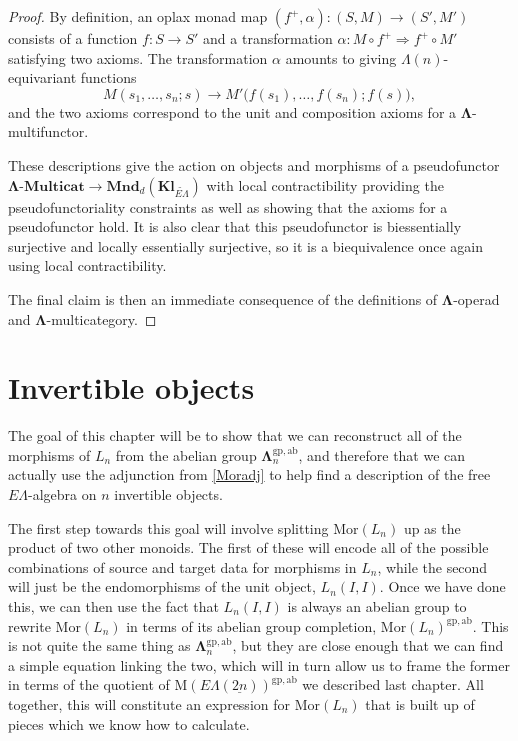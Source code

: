 \documentclass{amsbook} %
\newcommand{\mb}{\mathbf}
\newcommand{\MLn}{\mathbf{\Lambda}_n}
\newcommand{\MorLn}{\mathrm{Mor}(L_n)}
\newcommand{\ELnn}{E\Lambda(\underline{2n})}
\numberwithin{section}{chapter}
\begin{document}
\begin{proof}
By definition, an oplax monad map $(f^{+}, \alpha): (S,M) \to (S', M')$ consists of a function $f:S \to S'$ and a transformation $\alpha: M \circ f^{+} \Rightarrow f^{+} \circ M'$ satisfying two axioms.  The transformation $\alpha$ amounts to giving $\Lambda(n)$-equivariant functions
\[
M(s_1, \ldots, s_n; s) \to M'\big(f(s_1), \ldots, f(s_n); f(s)\big),
\]
and the two axioms correspond to the unit and composition axioms for a $\mb{\Lambda}$-multifunctor.

These descriptions give the action on objects and morphisms of a pseudofunctor $\mb{\Lambda}\mbox{-}\mb{Multicat} \to \mb{Mnd}_{d}(\mb{Kl}_{\widetilde{E\Lambda}})$ with local contractibility providing the pseudofunctoriality constraints as well as showing that the axioms for a pseudofunctor hold.  It is also clear that this pseudofunctor is biessentially surjective and locally essentially surjective, so it is a biequivalence once again using local contractibility.

The final claim is then an immediate consequence of the definitions of $\mb{\Lambda}$-operad and $\mb{\Lambda}$-multicategory.
\end{proof}


\chapter{Invertible objects}


The goal of this chapter will be to show that we can reconstruct all of the morphisms of $L_n$ from the abelian group $\MLn^{\mathrm{gp, ab}}$, and therefore that we can actually use the adjunction from \cref{Moradj} to help find a description of the free $E\Lambda$-algebra on $n$ invertible objects. 

The first step towards this goal will involve splitting $\MorLn$ up as the product of two other monoids. The first of these will encode all of the possible combinations of source and target data for morphisms in $L_n$, while the second will just be the endomorphisms of the unit object, $L_n(I, I)$. 
Once we have done this, we can then use the fact that $L_n(I, I)$ is always an abelian group to rewrite $\MorLn$ in terms of its abelian group completion, $\MorLn^{\mathrm{gp, ab}}$. This is not quite the same thing as $\MLn^{\mathrm{gp, ab}}$, but they are close enough that we can find a simple equation linking the two, which will in turn allow us to frame the former in terms of the quotient of $\mathrm{M}(\ELnn)^{\mathrm{gp, ab}}$ we described last chapter. All together, this will constitute an expression for $\MorLn$ that is built up of pieces which we know how to calculate.
\end{document}
